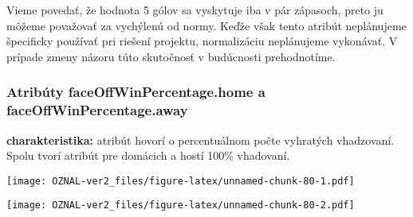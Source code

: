 \documentclass[
]{article}
\newenvironment{Shaded}{\begin{snugshade}}{\end{snugshade}}
\newcommand{\AttributeTok}[1]{\textcolor[rgb]{0.77,0.63,0.00}{#1}}
\newcommand{\FunctionTok}[1]{\textcolor[rgb]{0.00,0.00,0.00}{#1}}
\newcommand{\NormalTok}[1]{#1}
\newcommand{\SpecialCharTok}[1]{\textcolor[rgb]{0.00,0.00,0.00}{#1}}
\newcommand{\StringTok}[1]{\textcolor[rgb]{0.31,0.60,0.02}{#1}}
\begin{document}
Vieme povedať, že hodnota 5 gólov sa vyskytuje iba v pár zápasoch, preto
ju môžeme považovať za vychýlenú od normy. Keďže však tento atribút
neplánujeme špecificky používať pri riešení projektu, normalizáciu
neplánujeme vykonávať. V prípade zmeny názoru túto skutočnosť v
budúcnosti prehodnotíme.

\hypertarget{atribuxfaty-faceoffwinpercentage.home-a-faceoffwinpercentage.away}{%
\subsubsection{Atribúty faceOffWinPercentage.home a
faceOffWinPercentage.away}\label{atribuxfaty-faceoffwinpercentage.home-a-faceoffwinpercentage.away}}

\textbf{charakteristika:} atribút hovorí o percentuálnom počte vyhratých
vhadzovaní. Spolu tvorí atribút pre domácich a hostí 100\% vhadovaní.

\begin{Shaded}
\end{Shaded}

\texttt{[image: OZNAL-ver2\_files/figure-latex/unnamed-chunk-80-1.pdf]}

\begin{Shaded}
\end{Shaded}

\texttt{[image: OZNAL-ver2\_files/figure-latex/unnamed-chunk-80-2.pdf]}

\begin{Shaded}
\end{Shaded}
\end{document}
